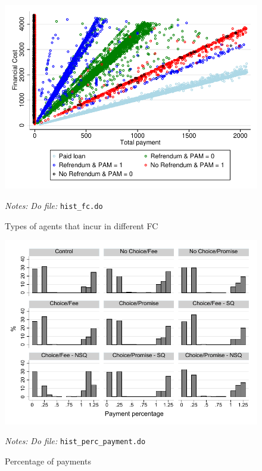 \documentclass[11pt]{article}
\begin{document}
\begin{figure}[H]
        \caption{Types of agents that incur in different FC}
    \label{components_fc}
    \begin{center}
        \centering
        \includegraphics[width=\textwidth]{Figuras/scatter_fc_pay.pdf}
    \end{center}
     \footnotesize \textit{Notes: } 
      \footnotesize{ \textit{Do file: }  \texttt{hist\_fc.do}}
\end{figure}

\begin{figure}[H]
        \caption{Percentage of payments}
    \label{Percentage_payments}
    \begin{center}
        \centering
        \includegraphics[width=\textwidth]{Figuras/hist_perc_payment.pdf}
    \end{center}
     \footnotesize \textit{Notes: } 
      \footnotesize{ \textit{Do file: }  \texttt{hist\_perc\_payment.do}}
\end{figure}
\end{document}
